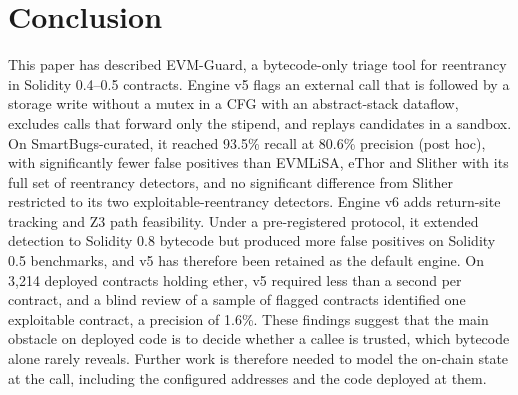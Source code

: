 \documentclass[pdflatex,sn-mathphys]{sn-jnl}
\theoremstyle{thmstyletwo}
\theoremstyle{thmstyletwo}
\begin{document}
\section{Conclusion}\label{sec:conclusion}
This paper has described EVM-Guard, a bytecode-only triage tool for reentrancy in Solidity 0.4--0.5 contracts. Engine v5 flags an external call that is followed by a storage write without a mutex in a CFG with an abstract-stack dataflow, excludes calls that forward only the stipend, and replays candidates in a sandbox. On SmartBugs-curated, it reached 93.5\% recall at 80.6\% precision (post hoc), with significantly fewer false positives than EVMLiSA, eThor and Slither with its full set of reentrancy detectors, and no significant difference from Slither restricted to its two exploitable-reentrancy detectors. Engine v6 adds return-site tracking and Z3 path feasibility. Under a pre-registered protocol, it extended detection to Solidity 0.8 bytecode but produced more false positives on Solidity 0.5 benchmarks, and v5 has therefore been retained as the default engine. On 3,214 deployed contracts holding ether, v5 required less than a second per contract, and a blind review of a sample of flagged contracts identified one exploitable contract, a precision of 1.6\%. These findings suggest that the main obstacle on deployed code is to decide whether a callee is trusted, which bytecode alone rarely reveals. Further work is therefore needed to model the on-chain state at the call, including the configured addresses and the code deployed at them.
\end{document}
